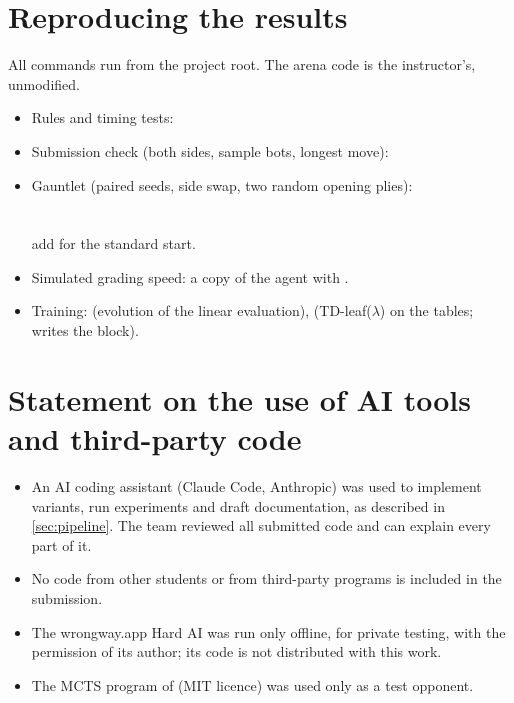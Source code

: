 


\appendix
\section{Reproducing the results}
\label{app:repro}
All commands run from the project root. The arena code is the instructor's, unmodified.
\begin{itemize}
  \item Rules and timing tests: 
  \item Submission check (both sides, sample bots, longest move):\\
  \item Gauntlet (paired seeds, side swap, two random opening plies):\\
        \\
        \\
        add  for the standard start.
  \item Simulated grading speed: a copy of the agent with .
  \item Training:  (evolution of the linear evaluation),
         (TD-leaf($\lambda$) on the tables; writes the
         block).
\end{itemize}

\section{Statement on the use of AI tools and third-party code}
\begin{itemize}
  \item An AI coding assistant (Claude Code, Anthropic) was used to implement variants, run
        experiments and draft documentation, as described in \cref{sec:pipeline}. The team
        reviewed all submitted code and can explain every part of it.
  \item No code from other students or from third-party programs is included in the
        submission.
  \item The wrongway.app Hard AI was run only offline, for private testing, with the permission
        of its author; its code is not distributed with this work.
  \item The MCTS program of \citet{gorisanson} (MIT licence) was used only as a test opponent.
\end{itemize}



